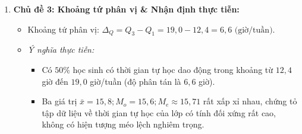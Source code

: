 \documentclass[12pt, a4paper]{article}
\begin{document}
\begin{enumerate}[leftmargin=0.6cm]
\begin{itemize}
        \item \textit{Tính Trung vị $M_e$:}
        Mốc $\dfrac{n}{2} = \dfrac{40}{2} = 20$.
        Vì $cf_2 = 14 < 20 \le cf_3 = 28$ nên nhóm chứa trung vị là $[14; 18)$.
        Các thông số: $u_m = 14, m_m = 14, C = cf_2 = 14, h = 4$.
        $$M_e = 14 + \dfrac{20 - 14}{14} \cdot 4 = 14 + \dfrac{6 \cdot 4}{14} = 14 + \dfrac{12}{7} \approx 14 + 1{,}71 = 15{,}71\text{ (giờ/tuần)}$$

        \item \textit{Tính Tứ phân vị thứ nhất $Q_1$:}
        Mốc $\dfrac{n}{4} = \dfrac{40}{4} = 10$.
        Vì $cf_1 = 4 < 10 \le cf_2 = 14$ nên nhóm chứa $Q_1$ là $[10; 14)$.
        Các thông số: $u_p = 10, m_p = 10, C_{p-1} = cf_1 = 4, h = 4$.
        $$Q_1 = 10 + \dfrac{10 - 4}{10} \cdot 4 = 10 + \dfrac{6}{10} \cdot 4 = 10 + 2{,}4 = 12{,}4\text{ (giờ/tuần)}$$

        \item \textit{Tính Tứ phân vị thứ ba $Q_3$:}
        Mốc $\dfrac{3n}{4} = \dfrac{3 \cdot 40}{4} = 30$.
        Vì $cf_3 = 28 < 30 \le cf_4 = 36$ nên nhóm chứa $Q_3$ là $[18; 22)$.
        Các thông số: $u_q = 18, m_q = 8, C_{q-1} = cf_3 = 28, h = 4$.
        $$Q_3 = 18 + \dfrac{30 - 28}{8} \cdot 4 = 18 + \dfrac{2}{8} \cdot 4 = 18 + 1{,}0 = 19{,}0\text{ (giờ/tuần)}$$
    \end{itemize}

    \item \textbf{Chủ đề 3: Khoảng tứ phân vị \& Nhận định thực tiễn:}
    \begin{itemize}
        \item Khoảng tứ phân vị: $\Delta_Q = Q_3 - Q_1 = 19{,}0 - 12{,}4 = 6{,}6\text{ (giờ/tuần)}$.
        \item \textit{Ý nghĩa thực tiễn:}
        \begin{itemize}
            \item Có $50\%$ học sinh có thời gian tự học dao động trong khoảng từ $12{,}4$ giờ đến $19{,}0$ giờ/tuần (độ phân tán là $6{,}6$ giờ).
            \item Ba giá trị $\bar{x} = 15{,}8; M_o = 15{,}6; M_e \approx 15{,}71$ rất xấp xỉ nhau, chứng tỏ tập dữ liệu về thời gian tự học của lớp có tính đối xứng rất cao, không có hiện tượng méo lệch nghiêm trọng.
        \end{itemize}
    \end{itemize}
\end{enumerate}
\end{document}
